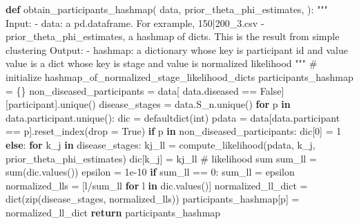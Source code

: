\documentclass[
  letterpaper,
  DIV=11,
  numbers=noendperiod]{scrreprt}
\newenvironment{Shaded}{\begin{snugshade}}{\end{snugshade}}
\newcommand{\BuiltInTok}[1]{\textcolor[rgb]{0.00,0.23,0.31}{#1}}
\newcommand{\CommentTok}[1]{\textcolor[rgb]{0.37,0.37,0.37}{#1}}
\newcommand{\ControlFlowTok}[1]{\textcolor[rgb]{0.00,0.23,0.31}{\textbf{#1}}}
\newcommand{\DecValTok}[1]{\textcolor[rgb]{0.68,0.00,0.00}{#1}}
\newcommand{\FloatTok}[1]{\textcolor[rgb]{0.68,0.00,0.00}{#1}}
\newcommand{\KeywordTok}[1]{\textcolor[rgb]{0.00,0.23,0.31}{\textbf{#1}}}
\newcommand{\NormalTok}[1]{\textcolor[rgb]{0.00,0.23,0.31}{#1}}
\newcommand{\OperatorTok}[1]{\textcolor[rgb]{0.37,0.37,0.37}{#1}}
\newcommand{\StringTok}[1]{\textcolor[rgb]{0.13,0.47,0.30}{#1}}
\newcommand{\VariableTok}[1]{\textcolor[rgb]{0.07,0.07,0.07}{#1}}
\begin{document}
\begin{Shaded}
\begin{Highlighting}[]
\KeywordTok{def}\NormalTok{ obtain\_participants\_hashmap(}
\NormalTok{        data, }
\NormalTok{        prior\_theta\_phi\_estimates,}
\NormalTok{):}
    \CommentTok{"""}
\CommentTok{    Input:}
\CommentTok{        {-} data: a pd.dataframe. For exrample, 150|200\_3.csv}
\CommentTok{        {-} prior\_theta\_phi\_estimates, a hashmap of dicts. }
\CommentTok{            This is the result from simple clustering }
\CommentTok{    }
\CommentTok{    Output: }
\CommentTok{        {-} hashmap: a dictionary whose key is participant id}
\CommentTok{            and value value is a dict whose key is stage }
\CommentTok{            and value is normalized likelihood}
\CommentTok{    """}
    \CommentTok{\# initialize hashmap\_of\_normalized\_stage\_likelihood\_dicts}
\NormalTok{    participants\_hashmap }\OperatorTok{=}\NormalTok{ \{\}}
\NormalTok{    non\_diseased\_participants }\OperatorTok{=}\NormalTok{ data[}
\NormalTok{        data.diseased }\OperatorTok{==} \VariableTok{False}\NormalTok{][}\StringTok{\textquotesingle{}participant\textquotesingle{}}\NormalTok{].unique()}
\NormalTok{    disease\_stages }\OperatorTok{=}\NormalTok{ data.S\_n.unique()}
    \ControlFlowTok{for}\NormalTok{ p }\KeywordTok{in}\NormalTok{ data.participant.unique():}
\NormalTok{        dic }\OperatorTok{=}\NormalTok{ defaultdict(}\BuiltInTok{int}\NormalTok{)}
\NormalTok{        pdata }\OperatorTok{=}\NormalTok{ data[data.participant }\OperatorTok{==}\NormalTok{ p].reset\_index(drop }\OperatorTok{=} \VariableTok{True}\NormalTok{)}
        \ControlFlowTok{if}\NormalTok{ p }\KeywordTok{in}\NormalTok{ non\_diseased\_participants:}
\NormalTok{            dic[}\DecValTok{0}\NormalTok{] }\OperatorTok{=} \DecValTok{1}
        \ControlFlowTok{else}\NormalTok{:}
            \ControlFlowTok{for}\NormalTok{ k\_j }\KeywordTok{in}\NormalTok{ disease\_stages:}
\NormalTok{                kj\_ll }\OperatorTok{=}\NormalTok{ compute\_likelihood(pdata, k\_j, prior\_theta\_phi\_estimates)}
\NormalTok{                dic[k\_j] }\OperatorTok{=}\NormalTok{ kj\_ll}
            \CommentTok{\# likelihood sum}
\NormalTok{            sum\_ll }\OperatorTok{=} \BuiltInTok{sum}\NormalTok{(dic.values())}
\NormalTok{            epsilon }\OperatorTok{=} \FloatTok{1e{-}10}
            \ControlFlowTok{if}\NormalTok{ sum\_ll }\OperatorTok{==} \DecValTok{0}\NormalTok{:}
\NormalTok{                sum\_ll }\OperatorTok{=}\NormalTok{ epsilon}
\NormalTok{            normalized\_lls }\OperatorTok{=}\NormalTok{ [l}\OperatorTok{/}\NormalTok{sum\_ll }\ControlFlowTok{for}\NormalTok{ l }\KeywordTok{in}\NormalTok{ dic.values()]}
\NormalTok{            normalized\_ll\_dict }\OperatorTok{=} \BuiltInTok{dict}\NormalTok{(}\BuiltInTok{zip}\NormalTok{(disease\_stages, normalized\_lls))}
\NormalTok{            participants\_hashmap[p] }\OperatorTok{=}\NormalTok{ normalized\_ll\_dict}
    \ControlFlowTok{return}\NormalTok{ participants\_hashmap }


\end{Highlighting}
\end{Shaded}
\end{document}
